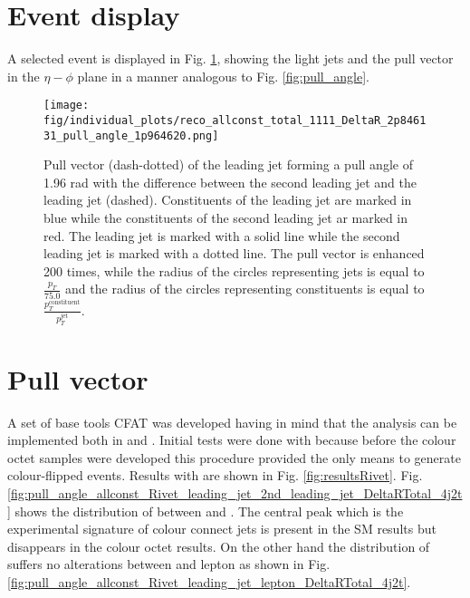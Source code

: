 \label{chap:results}
\section{Event display}
A selected event is displayed in Fig. \ref{fig:event_display}, showing the light jets and the pull vector in the $\eta - \phi$ plane in a manner analogous to Fig. \ref{fig:pull_angle}.

\begin{figure}[hbtp]
  \centering
  \texttt{[image: fig/individual\_plots/reco\_allconst\_total\_1111\_DeltaR\_2p846131\_pull\_angle\_1p964620.png]}
  \caption{Pull vector (dash-dotted) of the leading jet forming a pull angle of 1.96 rad with the difference between the second leading jet and the leading jet (dashed). Constituents of the leading jet are marked in blue while the constituents of the second leading jet ar marked in red. The leading jet is marked with a solid line while the second leading jet is marked with a dotted line. The pull vector is enhanced 200 times, while the radius of the circles representing jets is equal to $\frac{p_{T}}{75.0}$ and the radius of the circles representing constituents is equal to $\frac{p^{\text{constituent}}_{T}}{p^{\text{jet}}_{T}}$.}
  \label{fig:event_display}
\end{figure}

\section{Pull vector}

A set of base tools \textsc{CFAT} \cite{url:cfat} was developed having in mind that the analysis can be implemented both in \RIVET and \CMSSW. Initial tests were done with \RIVET because before the colour octet \PW samples were developed this procedure provided the only means to generate colour-flipped events. Results with \RIVET are shown in Fig. \ref{fig:resultsRivet}. Fig. \ref{fig:pull_angle_allconst_Rivet_leading_jet_2nd_leading_jet_DeltaRTotal_4j2t} shows the distribution of \pullangle between \leadingjet and \scndleadingjet. The central peak which is the experimental signature of colour connect jets is present in the SM results but disappears in the \PW colour octet results. On the other hand the distribution of \pullangle suffers no alterations between \leadingjet and lepton as shown in Fig. \ref{fig:pull_angle_allconst_Rivet_leading_jet_lepton_DeltaRTotal_4j2t}.

